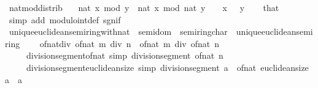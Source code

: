 \begin{isabellebody}
\ nat{\isacharunderscore}{\kern0pt}mod{\isacharunderscore}{\kern0pt}distrib{\isacharcolon}{\kern0pt}\ %
\isanewline
\ \ {\isacartoucheopen}nat\ {\isacharparenleft}{\kern0pt}x\ mod\ y{\isacharparenright}{\kern0pt}\ {\isacharequal}{\kern0pt}\ nat\ x\ mod\ nat\ y{\isacartoucheclose}\ \ {\isacartoucheopen}{}\ {\isasymle}\ x{\isacartoucheclose}\ {\isacartoucheopen}{}\ {\isasymle}\ y{\isacartoucheclose}\isanewline
%
\isadelimproof
\ \ %
\endisadelimproof
%
\isatagproof
{}\isamarkupfalse%
\ that\ \isamarkupfalse%
\ {\isacharparenleft}{\kern0pt}simp\ add{\isacharcolon}{\kern0pt}\ modulo{\isacharunderscore}{\kern0pt}int{\isacharunderscore}{\kern0pt}def\ sgn{\isacharunderscore}{\kern0pt}if{\isacharparenright}{\kern0pt}%
\endisatagproof
{\isafoldproof}%
%
\isadelimproof
%
\endisadelimproof
%
\isadelimdocument
%
\endisadelimdocument
%
\isatagdocument
%
\isamarkuptrue%
%
\endisatagdocument
{\isafolddocument}%
%
\isadelimdocument
%
\endisadelimdocument
{}\isamarkupfalse%
\ unique{\isacharunderscore}{\kern0pt}euclidean{\isacharunderscore}{\kern0pt}semiring{\isacharunderscore}{\kern0pt}with{\isacharunderscore}{\kern0pt}nat\ {\isacharequal}{\kern0pt}\ semidom\ {\isacharplus}{\kern0pt}\ semiring{\isacharunderscore}{\kern0pt}char{\isacharunderscore}{\kern0pt}{}\ {\isacharplus}{\kern0pt}\ unique{\isacharunderscore}{\kern0pt}euclidean{\isacharunderscore}{\kern0pt}semiring\ {\isacharplus}{\kern0pt}\isanewline
\ \ \ of{\isacharunderscore}{\kern0pt}nat{\isacharunderscore}{\kern0pt}div{\isacharcolon}{\kern0pt}\ {\isachardoublequoteopen}of{\isacharunderscore}{\kern0pt}nat\ {\isacharparenleft}{\kern0pt}m\ div\ n{\isacharparenright}{\kern0pt}\ {\isacharequal}{\kern0pt}\ of{\isacharunderscore}{\kern0pt}nat\ m\ div\ of{\isacharunderscore}{\kern0pt}nat\ n{\isachardoublequoteclose}\isanewline
\ \ \ \ \ division{\isacharunderscore}{\kern0pt}segment{\isacharunderscore}{\kern0pt}of{\isacharunderscore}{\kern0pt}nat\ {\isacharbrackleft}{\kern0pt}simp{\isacharbrackright}{\kern0pt}{\isacharcolon}{\kern0pt}\ {\isachardoublequoteopen}division{\isacharunderscore}{\kern0pt}segment\ {\isacharparenleft}{\kern0pt}of{\isacharunderscore}{\kern0pt}nat\ n{\isacharparenright}{\kern0pt}\ {\isacharequal}{\kern0pt}\ {}{\isachardoublequoteclose}\isanewline
\ \ \ \ \ division{\isacharunderscore}{\kern0pt}segment{\isacharunderscore}{\kern0pt}euclidean{\isacharunderscore}{\kern0pt}size\ {\isacharbrackleft}{\kern0pt}simp{\isacharbrackright}{\kern0pt}{\isacharcolon}{\kern0pt}\ {\isachardoublequoteopen}division{\isacharunderscore}{\kern0pt}segment\ a\ {\isacharasterisk}{\kern0pt}\ of{\isacharunderscore}{\kern0pt}nat\ {\isacharparenleft}{\kern0pt}euclidean{\isacharunderscore}{\kern0pt}size\ a{\isacharparenright}{\kern0pt}\ {\isacharequal}{\kern0pt}\ a{\isachardoublequoteclose}\isanewline

\end{isabellebody}
